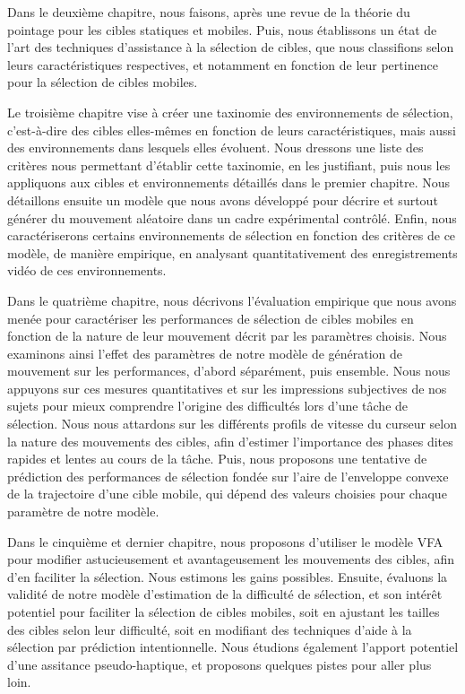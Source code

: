	Dans le deuxième chapitre, nous faisons, après une revue de la théorie du pointage pour les cibles statiques et mobiles. Puis, nous établissons un état de l'art des techniques d'assistance à la sélection de cibles, que nous classifions selon leurs caractéristiques respectives, et notamment en fonction de leur pertinence pour la sélection de cibles mobiles.
	
	Le troisième chapitre vise à créer une taxinomie des environnements de sélection, c'est-à-dire des cibles elles-mêmes en fonction de leurs caractéristiques, mais aussi des environnements dans lesquels elles évoluent. Nous dressons une liste des critères nous permettant d'établir cette taxinomie, en les justifiant, puis nous les appliquons aux cibles et environnements détaillés dans le premier chapitre. Nous détaillons ensuite un modèle que nous avons développé pour décrire et surtout générer du mouvement aléatoire dans un cadre expérimental contrôlé. Enfin, nous caractériserons certains environnements de sélection en fonction des critères de ce modèle, de manière empirique, en analysant quantitativement des enregistrements vidéo de ces environnements.
	
	Dans le quatrième chapitre, nous décrivons l'évaluation empirique que nous avons menée pour caractériser les performances de sélection de cibles mobiles en fonction de la nature de leur mouvement décrit par les paramètres choisis. Nous examinons ainsi l'effet des paramètres de notre modèle de génération de mouvement sur les performances, d'abord séparément, puis ensemble. Nous nous appuyons sur ces mesures quantitatives et sur les impressions subjectives de nos sujets pour mieux comprendre l'origine des difficultés lors d'une tâche de sélection. Nous nous attardons sur les différents profils de vitesse du curseur selon la nature des mouvements des cibles, afin d'estimer l'importance des phases dites rapides et lentes au cours de la tâche. Puis, nous proposons une tentative de prédiction des performances de sélection fondée sur l'aire de l'enveloppe convexe de la trajectoire d'une cible mobile, qui dépend des valeurs choisies pour chaque paramètre de notre modèle.
	
	Dans le cinquième et dernier chapitre, nous proposons d'utiliser le modèle VFA pour modifier astucieusement et avantageusement les mouvements des cibles, afin d'en faciliter la sélection. Nous estimons les gains possibles. Ensuite, évaluons la validité de notre modèle d'estimation de la difficulté de sélection, et son intérêt potentiel pour faciliter la sélection de cibles mobiles, soit en ajustant les tailles des cibles selon leur difficulté, soit en modifiant des techniques d'aide à la sélection par prédiction intentionnelle. Nous étudions également l'apport potentiel d'une assitance pseudo-haptique, et proposons quelques pistes pour aller plus loin.